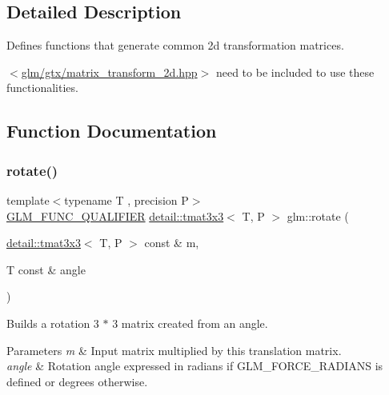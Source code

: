 \subsection{Detailed Description}
Defines functions that generate common 2d transformation matrices. 

$<$\hyperlink{matrix__transform__2d_8hpp}{glm/gtx/matrix\+\_\+transform\+\_\+2d.\+hpp}$>$ need to be included to use these functionalities. 

\subsection{Function Documentation}
\mbox{\label{group__gtx__matrix__transform__2d_gae172cd1e33a5c7b82c69a9731eac6c67}} 
\subsubsection{\texorpdfstring{rotate()}{rotate()}}
{\footnotesize\ttfamily template$<$typename T , precision P$>$ \\
\hyperlink{setup_8hpp_a33fdea6f91c5f834105f7415e2a64407}{G\+L\+M\+\_\+\+F\+U\+N\+C\+\_\+\+Q\+U\+A\+L\+I\+F\+I\+ER} \hyperlink{structglm_1_1detail_1_1tmat3x3}{detail\+::tmat3x3}$<$ T, P $>$ glm\+::rotate (\begin{DoxyParamCaption}\item[{\hyperlink{structglm_1_1detail_1_1tmat3x3}{detail\+::tmat3x3}$<$ T, P $>$ const \&}]{m,  }\item[{T const \&}]{angle }\end{DoxyParamCaption})}

Builds a rotation 3 $\ast$ 3 matrix created from an angle.


\begin{DoxyParams}{Parameters}
{\em m} & Input matrix multiplied by this translation matrix. \\
\hline
{\em angle} & Rotation angle expressed in radians if G\+L\+M\+\_\+\+F\+O\+R\+C\+E\+\_\+\+R\+A\+D\+I\+A\+NS is defined or degrees otherwise. \\
\hline
\end{DoxyParams}



